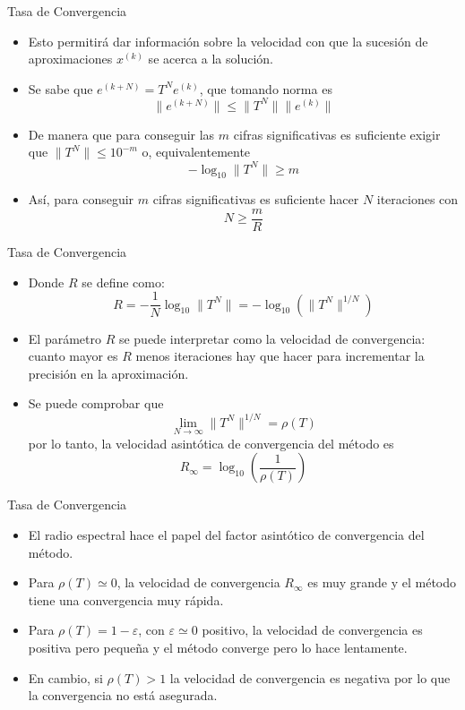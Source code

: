 \documentclass[10pt]{beamer}
\begin{document}
    \begin{frame}{Tasa de Convergencia}
    \begin{itemize}
     \item<1-> Esto permitir\'a dar informaci\'on sobre la velocidad con que la sucesi\'on de aproximaciones $x^{(k)}$ se acerca a la soluci\'on.
     \item<2-> Se sabe que $e^{(k+N)} = T^{N}e^{(k)}$, que tomando norma es
     $$
     \|e^{(k+N)}\| \leq \|T^{N}\|\|e^{(k)}\|
     $$
     \item<3-> De manera que para conseguir las $m$ cifras significativas es suficiente exigir que $\|T^{N}\| \leq 10^{-m}$ o, equivalentemente
     $$
     -\log_{10}\|T^{N}\| \geq m
     $$
     \item<4-> As\'i, para conseguir $m$ cifras significativas es suficiente hacer $N$ iteraciones con
     $$
     N \geq \frac{m}{R}
     $$
    \end{itemize}
    \end{frame}
    \begin{frame}{Tasa de Convergencia}
    \begin{itemize}
     \item Donde $R$ se define como:
     $$
     R = -\frac{1}{N}\log_{10}\|T^{N}\| = -\log_{10}\left(\|T^{N}\|^{1/N}\right)
     $$
     \item El par\'ametro $R$ se puede interpretar como la velocidad de convergencia: cuanto mayor es $R$ menos iteraciones hay que hacer para incrementar la precisi\'on en la aproximaci\'on.
     \item Se puede comprobar que
     $$
     \lim_{N \to \infty}\|T^{N}\|^{1/N} = \rho(T)
     $$
     por lo tanto, la velocidad asint\'otica de convergencia del m\'etodo es
     $$
     R_{\infty} = \log_{10}\left(\frac{1}{\rho(T)}\right)
     $$
     \end{itemize}
    \end{frame}
    \begin{frame}{Tasa de Convergencia}
    \begin{itemize}
     \item<1-> El radio espectral hace el papel del factor asint\'otico de convergencia del m\'etodo.
     \item<2-> Para $\rho(T) \simeq 0$, la velocidad de convergencia $R_{\infty}$ es muy grande y el m\'etodo tiene una convergencia muy r\'apida.
     \item<3-> Para $\rho(T) = 1 - \varepsilon$, con $\varepsilon \simeq 0$ positivo, la velocidad de convergencia es positiva pero peque\~na y el m\'etodo converge pero lo hace lentamente.
     \item<4-> En cambio, si $\rho(T) > 1$ la velocidad de convergencia es negativa por lo que la convergencia no est\'a asegurada.
    \end{itemize}
    \end{frame}
\end{document}
